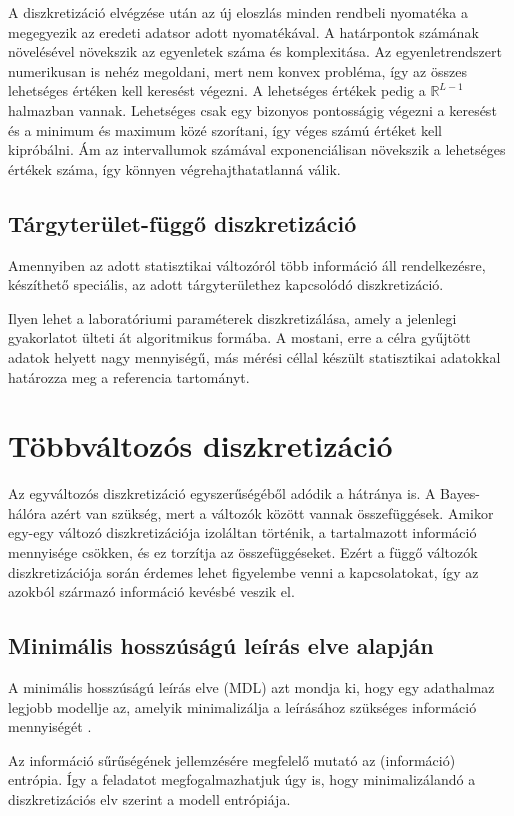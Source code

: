 A diszkretizáció elvégzése után az új eloszlás minden rendbeli nyomatéka a megegyezik az eredeti adatsor adott nyomatékával. A határpontok számának növelésével növekszik az egyenletek száma és komplexitása. Az egyenletrendszert numerikusan is nehéz megoldani, mert nem konvex probléma, így az összes lehetséges értéken kell keresést végezni. A lehetséges értékek pedig a $ \mathbb{R}^{L-1} $ halmazban vannak. Lehetséges csak egy bizonyos pontosságig végezni a keresést és a minimum és maximum közé szorítani, így véges számú értéket kell kipróbálni. Ám az intervallumok számával exponenciálisan növekszik a lehetséges értékek száma, így könnyen végrehajthatatlanná válik.

\subsection{Tárgyterület-függő diszkretizáció}
Amennyiben az adott statisztikai változóról több információ áll rendelkezésre, készíthető speciális, az adott tárgyterülethez kapcsolódó diszkretizáció.

Ilyen lehet a laboratóriumi paraméterek \cite{katayev2010establishing} diszkretizálása, amely a jelenlegi gyakorlatot ülteti át algoritmikus formába. A mostani, erre a célra gyűjtött adatok helyett nagy mennyiségű, más mérési céllal készült statisztikai adatokkal határozza meg a referencia tartományt.

\section{Többváltozós diszkretizáció}
Az egyváltozós diszkretizáció egyszerűségéből adódik a hátránya is. A Bayes-hálóra azért van szükség, mert a változók között vannak összefüggések. Amikor egy-egy változó diszkretizációja izoláltan történik, a tartalmazott információ mennyisége csökken, és ez torzítja az összefüggéseket. Ezért a függő változók diszkretizációja során érdemes lehet figyelembe venni a kapcsolatokat, így az azokból származó információ kevésbé veszik el.

\subsection{Minimális hosszúságú leírás elve alapján}
A minimális hosszúságú leírás elve (MDL) azt mondja ki, hogy egy adathalmaz legjobb modellje az, amelyik minimalizálja a leírásához szükséges információ mennyiségét \cite{friedman1996discretizing}.

Az információ sűrűségének jellemzésére megfelelő mutató az (információ) entrópia. Így a feladatot megfogalmazhatjuk úgy is, hogy minimalizálandó a diszkretizációs elv szerint a modell entrópiája.

